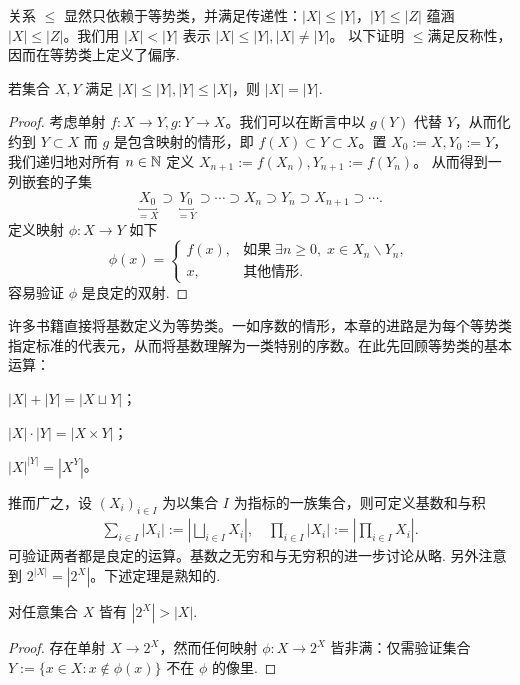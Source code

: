 关系 $\leqslant$ 显然只依赖于等势类，并满足传递性：$|X| \leqslant |Y|$，$|Y| \leqslant |Z|$ 蕴涵 $|X| \leqslant |Z|$。我们用 $|X| < |Y|$ 表示 $|X| \leqslant |Y|,|X| \neq |Y|$。 以下证明 $\leqslant $满足反称性，因而在等势类上定义了偏序.

\begin{theorem}\label{prop:Schröder-Bernstein}
	若集合 $X,Y$ 满足 $|X| \leqslant |Y|, |Y| \leqslant |X|$，则 $|X|=|Y|$.
\end{theorem}
\begin{proof}
	考虑单射 $f: X \to Y, g: Y \to X$。我们可以在断言中以 $g(Y)$ 代替 $Y$，从而化约到 $Y \subset X$ 而 $g$ 是包含映射的情形，即 $f(X) \subset Y \subset X$。置 $X_0 := X,Y_0 := Y$，我们递归地对所有 $n \in \mathbb{N}$ 定义 $X_{n+1} := f(X_n), Y_{n+1} := f(Y_n)$。
	从而得到一列嵌套的子集
	\[ \underbracket{X_0}_{=X} \supset \underbracket{Y_0}_{=Y} \supset \cdots \supset X_n \supset Y_n \supset X_{n+1} \supset \cdots .\]
	定义映射 $\phi: X \to Y$ 如下
	\[ \phi(x) = \begin{cases}
		f(x), & \text{如果}\; \exists n \geqslant 0,\; x \in X_n \backslash Y_n,\\
		x, & \text{其他情形}.
	\end{cases} \]
	容易验证 $\phi$ 是良定的双射.
\end{proof}

许多书籍直接将基数定义为等势类。一如序数的情形，本章的进路是为每个等势类指定标准的代表元，从而将基数理解为一类特别的序数。在此先回顾等势类的基本运算：
\begin{inparaenum}[(i)]
	\item $|X|+|Y| = |X \sqcup Y|$；
	\item $|X| \cdot |Y| = |X \times Y|$；
	\item $|X|^{|Y|} = |X^Y|$。
\end{inparaenum}
推而广之，设 $(X_i)_{i \in I}$ 为以集合 $I$ 为指标的一族集合，则可定义基数和与积
\begin{gather}
	\sum_{i \in I} |X_i| := \left\lvert \bigsqcup_{i \in I} X_i \right\rvert, \quad \prod_{i \in I} |X_i| := \left\lvert \prod_{i \in I} X_i \right\rvert.
\end{gather}
可验证两者都是良定的运算。基数之无穷和与无穷积的进一步讨论从略.
另外注意到 $2^{|X|} = |2^X|$。下述定理是熟知的.
\begin{theorem}[Cantor]
	对任意集合 $X$ 皆有 $|2^X| > |X|$.
\end{theorem}
\begin{proof}
	存在单射 $X \to 2^X$，然而任何映射 $\phi: X \to 2^X$ 皆非满：仅需验证集合 $Y := \{x \in X : x \notin \phi(x) \}$ 不在 $\phi$ 的像里.
\end{proof}


